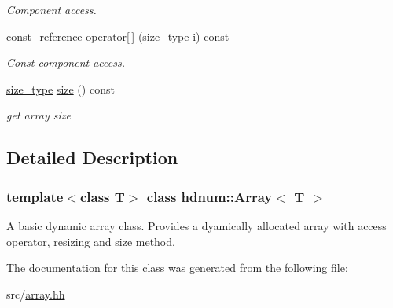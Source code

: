 \begin{DoxyCompactItemize}
\begin{DoxyCompactList}\small\item\em Component access. \item\end{DoxyCompactList}\item 
\hypertarget{classhdnum_1_1Array_a3101409df7b6f3970e3da5a2e57e297d}{
\hyperlink{classhdnum_1_1Array_ad696c724bcda975ea63492d0786a1509}{const\_\-reference} \hyperlink{classhdnum_1_1Array_a3101409df7b6f3970e3da5a2e57e297d}{operator\mbox{[}$\,$\mbox{]}} (\hyperlink{classhdnum_1_1Array_a52bad04c045624e4240073f8efb2e8e1}{size\_\-type} i) const }
\label{classhdnum_1_1Array_a3101409df7b6f3970e3da5a2e57e297d}

\begin{DoxyCompactList}\small\item\em Const component access. \item\end{DoxyCompactList}\item 
\hypertarget{classhdnum_1_1Array_a2362d0867e391b80f0f81c1754b0c81e}{
\hyperlink{classhdnum_1_1Array_a52bad04c045624e4240073f8efb2e8e1}{size\_\-type} \hyperlink{classhdnum_1_1Array_a2362d0867e391b80f0f81c1754b0c81e}{size} () const }
\label{classhdnum_1_1Array_a2362d0867e391b80f0f81c1754b0c81e}

\begin{DoxyCompactList}\small\item\em get array size \item\end{DoxyCompactList}\end{DoxyCompactItemize}


\subsection{Detailed Description}
\subsubsection*{template$<$class T$>$ class hdnum::Array$<$ T $>$}

A basic dynamic array class. Provides a dyamically allocated array with access operator, resizing and size method. 

The documentation for this class was generated from the following file:\begin{DoxyCompactItemize}
\item 
src/\hyperlink{array_8hh}{array.hh}\end{DoxyCompactItemize}
